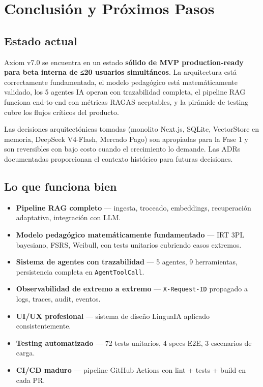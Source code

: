 \documentclass[10pt,a4paper,oneside]{report}
\begin{document}
\chapter{Conclusión y Próximos Pasos}

\section{Estado actual}
Axiom v7.0 se encuentra en un estado \textbf{sólido de MVP production-ready para beta interna de ≤20 usuarios simultáneos}. La arquitectura está correctamente fundamentada, el modelo pedagógico está matemáticamente validado, los 5 agentes IA operan con trazabilidad completa, el pipeline RAG funciona end-to-end con métricas RAGAS aceptables, y la pirámide de testing cubre los flujos críticos del producto.

Las decisiones arquitectónicas tomadas (monolito Next.js, SQLite, VectorStore en memoria, DeepSeek V4-Flash, Mercado Pago) son apropiadas para la Fase 1 y son reversibles con bajo costo cuando el crecimiento lo demande. Las ADRs documentadas proporcionan el contexto histórico para futuras decisiones.

\section{Lo que funciona bien}
\begin{itemize}[leftmargin=1.4em]
\item \textbf{Pipeline RAG completo} — ingesta, troceado, embeddings, recuperación adaptativa, integración con LLM.
\item \textbf{Modelo pedagógico matemáticamente fundamentado} — IRT 3PL bayesiano, FSRS, Weibull, con tests unitarios cubriendo casos extremos.
\item \textbf{Sistema de agentes con trazabilidad} — 5 agentes, 9 herramientas, persistencia completa en \texttt{AgentToolCall}.
\item \textbf{Observabilidad de extremo a extremo} — \texttt{X-Request-ID} propagado a logs, traces, audit, eventos.
\item \textbf{UI/UX profesional} — sistema de diseño LinguaIA aplicado consistentemente.
\item \textbf{Testing automatizado} — 72 tests unitarios, 4 specs E2E, 3 escenarios de carga.
\item \textbf{CI/CD maduro} — pipeline GitHub Actions con lint + tests + build en cada PR.
\end{itemize}
\end{document}
